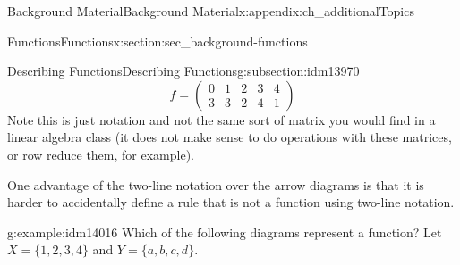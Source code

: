 \documentclass[oneside,10pt,]{book}
\numberwithin{equation}{chapter}
\newcommand{\twoline}[2]{\begin{pmatrix}#1 \\ #2 \end{pmatrix}}
\newcommand{\amp}{&}
\begin{document}
\begin{appendixptx}{Background Material}{}{Background Material}{}{}{x:appendix:ch_additionalTopics}
\begin{sectionptx}{Functions}{}{Functions}{}{}{x:section:sec_background-functions}
\begin{subsectionptx}{Describing Functions}{}{Describing Functions}{}{}{g:subsection:idm13970}
\begin{equation*}
f = \twoline{0 \amp 1 \amp 2\amp 3 \amp 4}{3 \amp 3 \amp 2 \amp 4 \amp 1}
\end{equation*}
Note this is just notation and not the same sort of matrix you would find in a linear algebra class (it does not make sense to do operations with these matrices, or row reduce them, for example).%
\par
One advantage of the two-line notation over the arrow diagrams is that it is harder to accidentally define a rule that is not a function using two-line notation.%
\begin{example}{}{g:example:idm14016}%
Which of the following diagrams represent a function? Let \(X = \{1,2,3,4\}\) and \(Y = \{a,b,c,d\}\).%
\begin{sidebyside}{3}{0.0416666666666667}{0.0416666666666667}{0.0833333333333333}%
\begin{sbspanel}{0.25}%
%
\end{sbspanel}%
\begin{sbspanel}{0.25}%
%
\end{sbspanel}%
\begin{sbspanel}{0.25}%
\end{sbspanel}
\end{sidebyside}
\end{example}
\end{subsectionptx}
\end{sectionptx}
\end{appendixptx}
\end{document}
